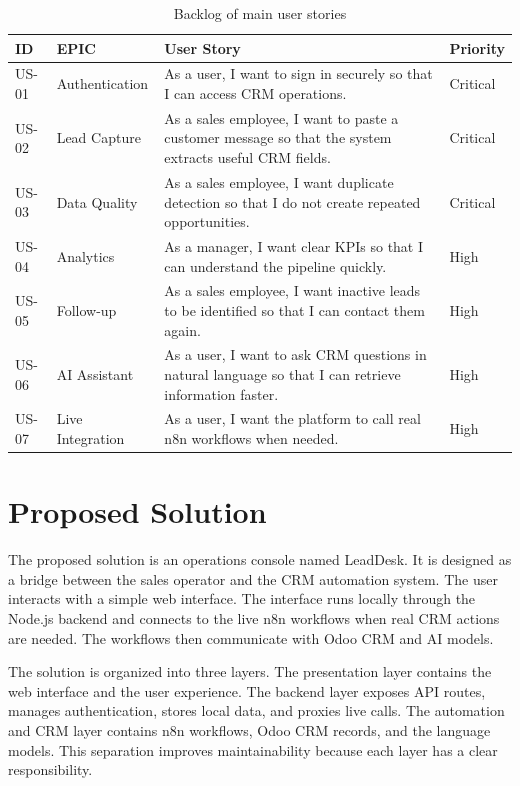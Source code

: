 \documentclass[12pt,a4paper,oneside]{report}
\begin{document}
\begin{table}[H]
\centering
\small
\begin{tabularx}{\textwidth}{|p{1.5cm}|p{3.2cm}|X|p{2cm}|}
\hline\rowcolor{TabHead}
\textbf{ID} & \textbf{EPIC} & \textbf{User Story} & \textbf{Priority} \\
\hline
US-01 & Authentication & As a user, I want to sign in securely so that I can access CRM operations. & Critical \\
\hline
US-02 & Lead Capture & As a sales employee, I want to paste a customer message so that the system extracts useful CRM fields. & Critical \\
\hline
US-03 & Data Quality & As a sales employee, I want duplicate detection so that I do not create repeated opportunities. & Critical \\
\hline
US-04 & Analytics & As a manager, I want clear KPIs so that I can understand the pipeline quickly. & High \\
\hline
US-05 & Follow-up & As a sales employee, I want inactive leads to be identified so that I can contact them again. & High \\
\hline
US-06 & AI Assistant & As a user, I want to ask CRM questions in natural language so that I can retrieve information faster. & High \\
\hline
US-07 & Live Integration & As a user, I want the platform to call real n8n workflows when needed. & High \\
\hline
\end{tabularx}
\caption{Backlog of main user stories}
\end{table}
\section{Proposed Solution}\label{sumlbl:c1s6}
The proposed solution is an operations console named LeadDesk. It is designed as a bridge between the sales operator and the CRM automation system. The user interacts with a simple web interface. The interface runs locally through the Node.js backend and connects to the live n8n workflows when real CRM actions are needed. The workflows then communicate with Odoo CRM and AI models.

The solution is organized into three layers. The presentation layer contains the web interface and the user experience. The backend layer exposes API routes, manages authentication, stores local data, and proxies live calls. The automation and CRM layer contains n8n workflows, Odoo CRM records, and the language models. This separation improves maintainability because each layer has a clear responsibility.
\end{document}
